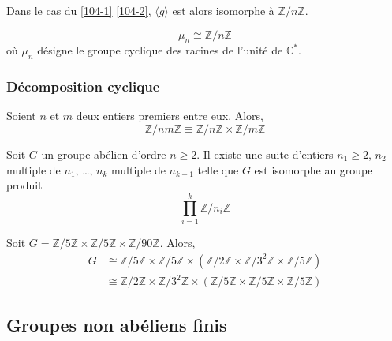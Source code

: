
  \begin{proposition}
    Dans le cas du \cref{104-1} \cref{104-2}, $\langle g \rangle$ est alors isomorphe à $\mathbb{Z}/n\mathbb{Z}$.
  \end{proposition}

  \begin{example}
    \[ \mu_n \cong \mathbb{Z}/n\mathbb{Z} \]
    où $\mu_n$ désigne le groupe cyclique des racines de l'unité de $\mathbb{C}^*$.
  \end{example}

  \subsubsection{Décomposition cyclique}


  \begin{theorem}
    Soient $n$ et $m$ deux entiers premiers entre eux. Alors,
    \[ \mathbb{Z}/nm\mathbb{Z} \equiv \mathbb{Z}/n\mathbb{Z} \times \mathbb{Z}/m\mathbb{Z} \]
  \end{theorem}


  \begin{theorem}
    Soit $G$ un groupe abélien d'ordre $n \geq 2$. Il existe une suite d'entiers $n_1 \geq 2$, $n_2$ multiple de $n_1$, \dots, $n_k$ multiple de $n_{k-1}$ telle que $G$ est isomorphe au groupe produit
    \[ \prod_{i=1}^k \mathbb{Z}/n_i\mathbb{Z} \]
  \end{theorem}

  \begin{example}
    Soit $G = \mathbb{Z}/5\mathbb{Z} \times \mathbb{Z}/5\mathbb{Z} \times \mathbb{Z}/90\mathbb{Z}$. Alors,
    \begin{align*}
      G &\cong \mathbb{Z}/5\mathbb{Z} \times \mathbb{Z}/5\mathbb{Z} \times (\mathbb{Z}/2\mathbb{Z} \times \mathbb{Z}/3^2\mathbb{Z} \times \mathbb{Z}/5\mathbb{Z}) \\
      &\cong \mathbb{Z}/2\mathbb{Z} \times \mathbb{Z}/3^2\mathbb{Z} \times (\mathbb{Z}/5\mathbb{Z} \times \mathbb{Z}/5\mathbb{Z} \times \mathbb{Z}/5\mathbb{Z})
    \end{align*}
  \end{example}

  \subsection{Groupes non abéliens finis}

